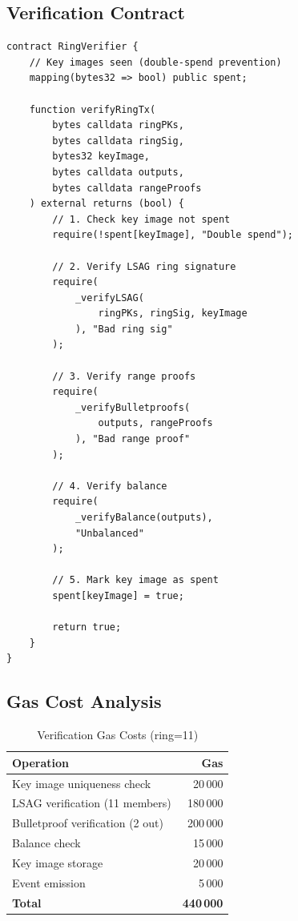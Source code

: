 \documentclass[11pt,a4paper]{article}
\begin{document}
\subsection{Verification Contract}

\begin{lstlisting}[language=Solidity,caption={Ring Signature Verifier}]
contract RingVerifier {
    // Key images seen (double-spend prevention)
    mapping(bytes32 => bool) public spent;

    function verifyRingTx(
        bytes calldata ringPKs,
        bytes calldata ringSig,
        bytes32 keyImage,
        bytes calldata outputs,
        bytes calldata rangeProofs
    ) external returns (bool) {
        // 1. Check key image not spent
        require(!spent[keyImage], "Double spend");

        // 2. Verify LSAG ring signature
        require(
            _verifyLSAG(
                ringPKs, ringSig, keyImage
            ), "Bad ring sig"
        );

        // 3. Verify range proofs
        require(
            _verifyBulletproofs(
                outputs, rangeProofs
            ), "Bad range proof"
        );

        // 4. Verify balance
        require(
            _verifyBalance(outputs),
            "Unbalanced"
        );

        // 5. Mark key image as spent
        spent[keyImage] = true;

        return true;
    }
}
\end{lstlisting}

\subsection{Gas Cost Analysis}

\begin{table}[h]
\centering
\caption{Verification Gas Costs (ring=11)}
\label{tab:gas}
\begin{tabular}{@{}lr@{}}
\toprule
\textbf{Operation} & \textbf{Gas} \\
\midrule
Key image uniqueness check       & 20\,000 \\
LSAG verification (11 members)   & 180\,000 \\
Bulletproof verification (2 out) & 200\,000 \\
Balance check                    & 15\,000 \\
Key image storage                & 20\,000 \\
Event emission                   & 5\,000 \\
\midrule
\textbf{Total}                   & \textbf{440\,000} \\
\bottomrule
\end{tabular}
\end{table}
\end{document}
